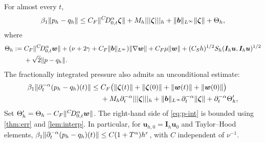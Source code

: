 \begin{proposition}\label{prop:pressure}
For almost every $t$,
\begin{equation}\label{eq:p-cond}
\beta_1\|p_h-q_h\|\le C_F\|{}^{C}\!D_{0,t}^{\alpha}\bm\zeta\|+M_h|||\bm\zeta|||_h+\|\boldsymbol b\|_{L^\infty}\|\bm\zeta\|+\Theta_h,
\end{equation}
where
\[
\begin{aligned}
\Theta_h:={}&C_F\|{}^{C}\!D_{0,t}^{\alpha}\bm w\|+(\nu+2\gamma+C_F\|\boldsymbol b\|_{L^\infty})\|\nabla\bm w\|+C_F\mu\|\bm w\|+(C_Sh)^{1/2}S_h(\bm I_h\bm u,\bm I_h\bm u)^{1/2}\\
&+\sqrt2\|p-q_h\| .
\end{aligned}
\]
The fractionally integrated pressure also admits an unconditional estimate:
\begin{equation}\label{eq:p-int}
\begin{aligned}
\beta_1\|\partial_t^{-\alpha}(p_h-q_h)(t)\|\le{}&C_F\bigl(\|\bm\zeta(t)\|+\|\bm\zeta(0)\|+\|\bm w(t)\|+\|\bm w(0)\|\bigr)\\
&+M_h\partial_t^{-\alpha}|||\bm\zeta|||_h+\|\boldsymbol b\|_{L^\infty}\partial_t^{-\alpha}\|\bm\zeta\|+\partial_t^{-\alpha}\Theta_h',
\end{aligned}
\end{equation}
Set $\Theta_h'=\Theta_h-C_F\|{}^{C}\!D_{0,t}^{\alpha}\bm w\|$. The right-hand side of \eqref{eq:p-int} is bounded using \cref{thm:err} and \cref{lem:interp}. In particular, for $\bm u_{h,0}=\bm I_h\bm u_0$ and Taylor--Hood elements, $\beta_1\|\partial_t^{-\alpha}(p_h-q_h)(t)\|\le C(1+T^\alpha)h^r$, with $C$ independent of $\nu^{-1}$.
\end{proposition}
